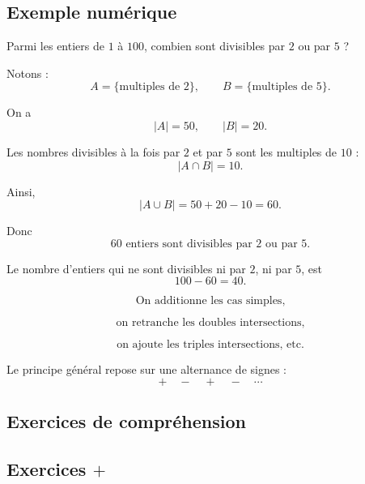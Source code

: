 \documentclass[11pt]{article}
\begin{document}
\subsection{Exemple numérique}\label{sec:exemple-numerique}

\begin{exemple}
Parmi les entiers de \(1\) à \(100\), combien sont divisibles par \(2\) ou par
\(5\) ?
\end{exemple}

\begin{solution}
Notons :
\[
A=\{\text{multiples de }2\},
\qquad
B=\{\text{multiples de }5\}.
\]

On a
\[
|A|=50,
\qquad
|B|=20.
\]

Les nombres divisibles à la fois par \(2\) et par \(5\) sont les multiples de
\(10\) :
\[
|A\cap B|=10.
\]

Ainsi,
\[
|A\cup B|
=
50+20-10
=
60.
\]

Donc
\[
\boxed{60\text{ entiers sont divisibles par }2\text{ ou par }5.}
\]

Le nombre d'entiers qui ne sont divisibles ni par \(2\), ni par \(5\), est
\[
100-60=40.
\]
\end{solution}

\begin{retenir}
\[
\boxed{
\text{On additionne les cas simples,}
}
\]

\[
\boxed{
\text{on retranche les doubles intersections,}
}
\]

\[
\boxed{
\text{on ajoute les triples intersections, etc.}
}
\]

Le principe général repose sur une alternance de signes :
\[
\boxed{
+\quad -\quad +\quad -\quad \cdots
}
\]
\end{retenir}

\subsection*{Exercices de compréhension}


\subsection*{Exercices \texorpdfstring{$+$}{+}}

\end{document}
